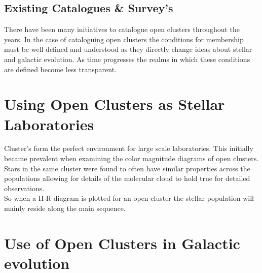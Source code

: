 \subsection{Existing Catalogues \& Survey's}

There have been many initiatives to catalogue open clusters throughout the years. In the case of cataloguing open clusters the conditions for membership must be well defined and understood as they directly change ideas about stellar and galactic evolution. As time progresses the realms in which these conditions are defined become less transparent. 




\section{Using Open Clusters as Stellar Laboratories}
Cluster's form the perfect environment for large scale laboratories. This initially became prevalent when examining the color magnitude diagrams of open clusters. Stars in the same cluster were found to often have similar properties across the populations \cite{trumpler_1930} allowing for details of the molecular cloud to hold true for detailed observations. \\ So when a H-R diagram is plotted for an open cluster the stellar population will mainly reside along the main sequence. 


\section{Use of Open Clusters in Galactic evolution }